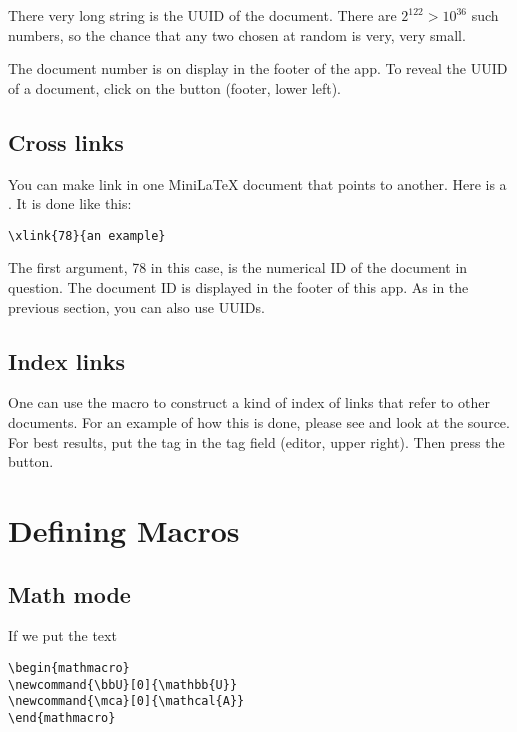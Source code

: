 There very long string  is the UUID of the document. There are $2^{122} > 10^{36}$ such numbers, so the chance that any two chosen at random is very, very small.

The document number is on display in the footer of the app.  To reveal the UUID of a document, click on the  button (footer, lower left).

\subsection{Cross links}

You can make link in one MiniLaTeX document that points to another.
Here is a . It is done like this:

\begin{verbatim}
\xlink{78}{an example}
\end{verbatim}

The first argument, 78 in this case, is the numerical ID of the document in question. The document ID is displayed in the footer of this app.
As in the previous section, you can also use UUIDs.





\subsection{Index links}

One can use the  macro to construct a kind of index of links that refer to other documents.  For an example of how this is done, please see  and look at the source. For best results, put the tag  in the tag field (editor, upper right).  Then press the  button.

\section{Defining Macros}

\subsection{Math mode}

If we put the text

\begin{verbatim}
\begin{mathmacro}
\newcommand{\bbU}[0]{\mathbb{U}}
\newcommand{\mca}[0]{\mathcal{A}}
\end{mathmacro}
\end{verbatim}


